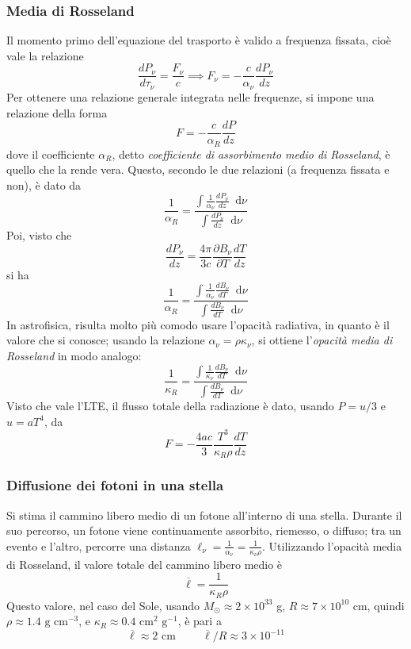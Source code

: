 \documentclass[11pt, a4paper]{scrartcl}
\theoremstyle{style}
\theoremstyle{style1}
\newcommand{\dd}{\mathop{}\!\mathrm{d}}
\numberwithin{equation}{subsection}
\begin{document}
\subsubsection{Media di Rosseland}
Il momento primo dell'equazione del trasporto \`e valido a frequenza fissata, cio\`e vale la relazione 
\[
\frac{d P_\nu }{d \tau _\nu } = \frac{F_\nu }{c} \implies F_\nu  = - \frac{c}{\alpha _\nu }\frac{d P_\nu }{d z} 
\] 
Per ottenere una relazione generale integrata nelle frequenze, si impone una relazione della forma 
\[
F = - \frac{c}{\alpha _R} \frac{d P}{d z} 
\] 
dove il coefficiente $\alpha _R$, detto \textit{coefficiente di assorbimento medio di Rosseland}, \`e quello che la rende vera.
Questo, secondo le due relazioni (a frequenza fissata e non), \`e dato da 
\[
\frac{1}{\alpha _R} = \frac{\int \frac{1}{\alpha _\nu }\frac{d P_\nu }{d z}\dd \nu  }{\int \frac{d P_\nu }{d z} \dd \nu }
\] 
Poi, visto che 
\[
\frac{d P_\nu }{d z} = \frac{4\pi}{3c} \frac{\partial B_\nu }{\partial T} \frac{d T}{d z} 
\] 
si ha 
\[
\frac{1}{\alpha _R} = \frac{\int \frac{1}{\alpha _\nu }\frac{d B_\nu }{d T} \dd \nu }{\int \frac{d B_\nu }{d T} \dd \nu }
\] 
In astrofisica, risulta molto pi\`u comodo usare l'opacit\`a radiativa, in quanto \`e il valore che si conosce; usando la relazione $\alpha  _ \nu  = \rho  \kappa _\nu $, si ottiene l'\textit{opacit\`a media di Rosseland} in modo analogo:
\begin{equation}
\frac{1}{\kappa _R} = \frac{\displaystyle \int \frac{1}{\kappa _\nu }\frac{d B_\nu }{d T} \dd \nu }{\displaystyle \int \frac{d B_\nu }{d T} \dd \nu }
\end{equation}
Visto che vale l'LTE, il flusso totale della radiazione \`e dato, usando $P = u / 3$ e $u = a T^4$, da
\begin{equation}
	F = - \frac{4 a c}{3} \frac{T^3}{\kappa _R \rho } \frac{d T}{d z} 
\end{equation}
\subsubsection{Diffusione dei fotoni in una stella}
Si stima il cammino libero medio di un fotone all'interno di una stella.
Durante il suo percorso, un fotone viene continuamente assorbito, riemesso, o diffuso; tra un evento e l'altro, percorre una distanza $\ell _\nu  = \frac{1}{\alpha _\nu } = \frac{1}{\kappa _\nu \rho }$.
Utilizzando l'opacit\`a media di Rosseland, il valore totale del cammino libero medio \`e
\[
\overline{\ell } = \frac{1}{\kappa _R \rho }
\] 
Questo valore, nel caso del Sole, usando $M_\odot \approx 2 \times 10^{33} $ g, $R\approx 7 \times 10^{10} $ cm, quindi $\rho  \approx 1.4 \text{ g cm}^{-3}$, e $\kappa _R \approx 0.4 \text{ cm}^2 \text{ g}^{-1}$, \`e pari a 
\[
\overline{\ell } \approx 2\text{ cm} \hspace{1cm} \overline{\ell } / R \approx 3 \times 10^{-11}
\] 
\end{document}
